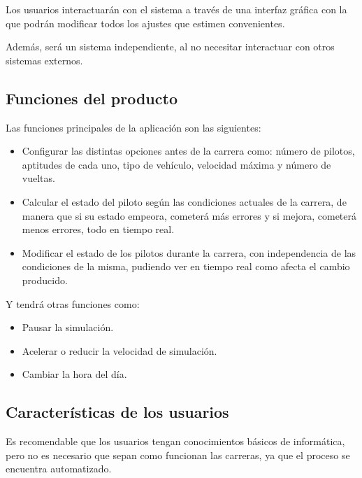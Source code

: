 \bigskip

Los usuarios interactuarán con el sistema a través de una interfaz gráfica con la que podrán modificar todos los ajustes que estimen convenientes.

\bigskip

Además, será un sistema independiente, al no necesitar interactuar con otros sistemas externos.

\subsection{Funciones del producto}

Las funciones principales de la aplicación son las siguientes:

\begin{itemize}
    \item 
    Configurar las distintas opciones antes de la carrera como: número de pilotos, aptitudes de cada uno, tipo de vehículo, velocidad máxima y número de vueltas. 
    
    \item Calcular el estado del piloto según las condiciones actuales de la carrera, de manera que si su estado empeora, cometerá más errores y si mejora, cometerá menos errores, todo en tiempo real.
    
    \item Modificar el estado de los pilotos durante la carrera, con independencia de las condiciones de la misma, pudiendo ver en tiempo real como afecta el cambio producido.
\end{itemize}

Y tendrá otras funciones como:

\begin{itemize}
    \item Pausar la simulación.
    \item Acelerar o reducir la velocidad de simulación.
    \item Cambiar la hora del día.
\end{itemize}

\subsection{Características de los usuarios}

Es recomendable que los usuarios tengan conocimientos básicos de informática, pero no es necesario que sepan como funcionan las carreras, ya que el proceso se encuentra automatizado. 

